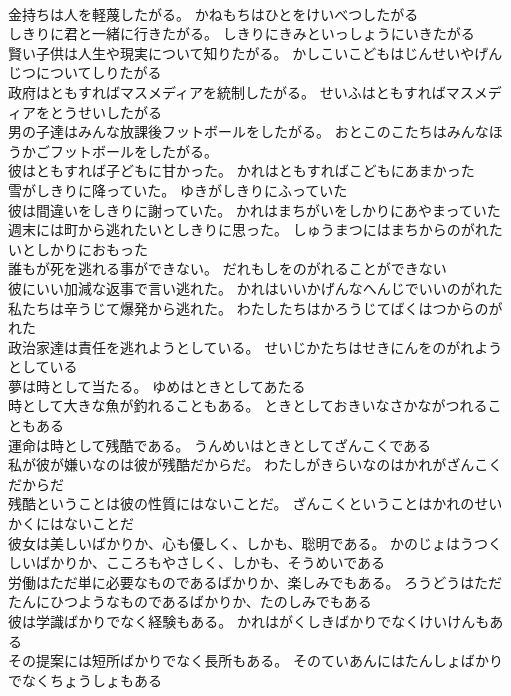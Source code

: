 \documentclass[8pt]{extreport}
\begin{document}
\begin{CJK}{UTF8}{min}
\\	金持ちは人を軽蔑したがる。	かねもちはひとをけいべつしたがる 
\\	しきりに君と一緒に行きたがる。	しきりにきみといっしょうにいきたがる 
\\	賢い子供は人生や現実について知りたがる。	かしこいこどもはじんせいやげんじつについてしりたがる 
\\	政府はともすればマスメディアを統制したがる。	せいふはともすればマスメディアをとうせいしたがる 
\\	男の子達はみんな放課後フットボールをしたがる。	おとこのこたちはみんなほうかごフットボールをしたがる。 
\\	彼はともすれば子どもに甘かった。	かれはともすればこどもにあまかった 
\\	雪がしきりに降っていた。	ゆきがしきりにふっていた 
\\	彼は間違いをしきりに謝っていた。	かれはまちがいをしかりにあやまっていた 
\\	週末には町から逃れたいとしきりに思った。	しゅうまつにはまちからのがれたいとしかりにおもった 
\\	誰もが死を逃れる事ができない。	だれもしをのがれることができない 
\\	彼にいい加減な返事で言い逃れた。	かれはいいかげんなへんじでいいのがれた 
\\	私たちは辛うじて爆発から逃れた。	わたしたちはかろうじてばくはつからのがれた 
\\	政治家達は責任を逃れようとしている。	せいじかたちはせきにんをのがれようとしている 
\\	夢は時として当たる。	ゆめはときとしてあたる 
\\	時として大きな魚が釣れることもある。	ときとしておきいなさかながつれることもある 
\\	運命は時として残酷である。	うんめいはときとしてざんこくである 
\\	私が彼が嫌いなのは彼が残酷だからだ。	わたしがきらいなのはかれがざんこくだからだ 
\\	残酷ということは彼の性質にはないことだ。	ざんこくということはかれのせいかくにはないことだ 
\\	彼女は美しいばかりか、心も優しく、しかも、聡明である。	かのじょはうつくしいばかりか、こころもやさしく、しかも、そうめいである 
\\	労働はただ単に必要なものであるばかりか、楽しみでもある。	ろうどうはただたんにひつようなものであるばかりか、たのしみでもある 
\\	彼は学識ばかりでなく経験もある。	かれはがくしきばかりでなくけいけんもある 
\\	その提案には短所ばかりでなく長所もある。	そのていあんにはたんしょばかりでなくちょうしょもある 

\end{CJK}
\end{document}
